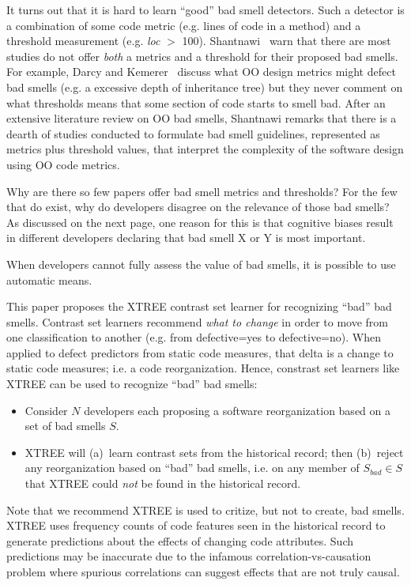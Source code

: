 \documentclass{sig-alternate}
\begin{document}
It turns out that it is hard to learn ``good'' bad smell detectors. Such a detector
is a combination of some code metric (e.g. lines of code in a method)
and a threshold measurement (e.g. {\em loc} $>$ 100). 
Shantnawi~\cite{Shatnawi10} warn that  there are most  studies do not offer
{\em both} a metrics and a threshold for their proposed bad smells. For example,  Darcy and Kemerer~\cite{darcy05}
discuss what OO design metrics might defect bad smells (e.g. a excessive
depth of inheritance tree) but they never comment on what thresholds
means that some section of code starts to smell bad. After
an extensive literature review on OO bad smells, Shantnawi remarks that there is a dearth
of  studies  conducted to formulate bad smell guidelines,
represented as metrics plus threshold values, that interpret the complexity of the software design using OO code metrics. 

Why are there so few papers offer bad smell metrics and thresholds? For the few that
do exist, why do developers disagree on the relevance of those bad smells?
As discussed on the next page, one reason for this is that 
   cognitive biases result in different
developers declaring that
bad smell X or Y is most important. 

When developers cannot fully assess the value of bad smells,
it is possible to use automatic means. 

This paper proposes the XTREE contrast set learner for recognizing
``bad'' bad smells. 
Contrast set learners   recommend {\em what to change} in order to move from
     one classification to another (e.g. from defective=yes to
     defective=no).
     When applied to defect predictors from static code measures,
that delta is a change to static code measures;
i.e. a code reorganization. Hence, constrast set learners
like XTREE can be used to  recognize ``bad''
bad smells:
\begin{itemize}
    \item Consider $N$ developers each proposing a software reorganization
based on a set of bad smells $S$.
\item XTREE will (a)~learn contrast sets
from the historical record; then (b)~reject  any reorganization based on ``bad'' bad smells, i.e.
 on any member of $S_{\mathit{bad}} \in S$
that XTREE could {\em not} be found in the historical record.
\end{itemize}
Note that we    recommend  XTREE  is used to critize, but  not to create,
bad smells. 
XTREE uses frequency counts of code features seen in the historical record
to generate
predictions about the effects of changing code
attributes. Such predictions may be inaccurate due to the infamous correlation-vs-causation problem
where spurious correlations can suggest effects that are not
truly causal.
\end{document}
